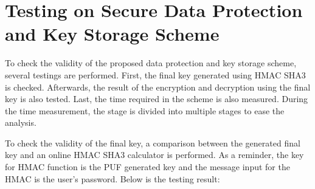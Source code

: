 \section{Testing on Secure Data Protection and Key Storage Scheme}\label{ch:testing_scheme}
To check the validity of the proposed data protection and key storage scheme, several testings are performed. First, the final key generated using HMAC SHA3 is checked. Afterwards, the result of the encryption and decryption using the final key is also tested. Last, the time required in the scheme is also measured. During the time measurement, the stage is divided into multiple stages to ease the analysis.

To check the validity of the final key, a comparison between the generated final key and an online HMAC SHA3 calculator \cite{hmac_calculator} is performed. As a reminder, the key for HMAC function is the PUF generated key and the message input for the HMAC is the user's password. Below is the testing result:

